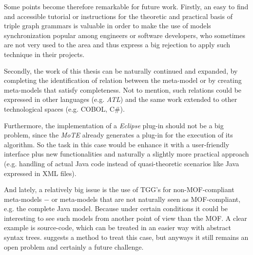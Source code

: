 \documentclass[tuberlin,cic,tc,english,noabntcite]{iiufrgs}
\begin{document}
Some points become therefore remarkable for future work. Firstly, an easy to find and accessible tutorial or instructions for the theoretic and practical basis of triple graph grammars is valuable in order to make the use of models synchronization popular among engineers or software developers, who sometimes are not very used to the area and thus express a big rejection to apply such technique in their projects.

Secondly, the work of this thesis can be naturally continued and expanded, by completing the identification of relation between the meta-model or by creating meta-models that satisfy completeness. Not to mention, such relations could be expressed in other languages (e.g. \emph{ATL}) and the same work extended to other technological spaces (e.g. COBOL, C\#).

Furthermore, the implementation of a \emph{Eclipse} plug-in should not be a big problem, since the \emph{MoTE} already generates a plug-in for the execution of its algorithm. So the task in this case would be enhance it with a user-friendly interface plus new functionalities and naturally a slightly more practical approach (e.g. handling of actual Java code instead of quasi-theoretic scenarios like Java expressed in XML files).

And lately, a relatively big issue is the use of TGG's for non-MOF-compliant meta-models $-$ or meta-models that are not naturally seen as MOF-compliant, e.g. the complete Java model. Because under certain conditions it could be interesting to see such models from another point of view than the MOF. A clear example is source-code, which can be treated in an easier way with abstract syntax trees. \citet{angyal2008novel} suggests a method to treat this case, but anyways it still remains an open problem and certainly a future challenge.








\end{document}
